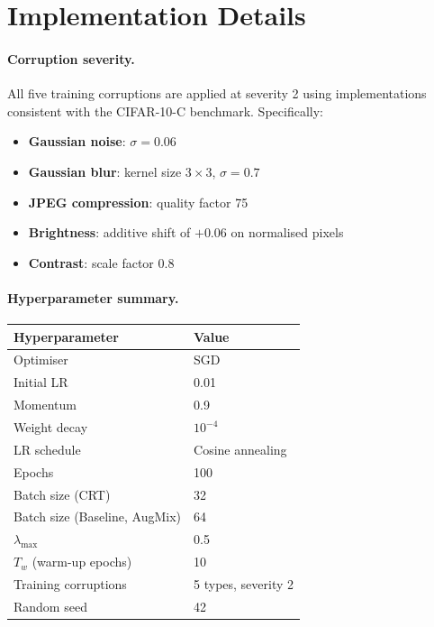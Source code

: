 \documentclass[10pt,twocolumn]{article}
\begin{document}
\appendix

\section{Implementation Details}
\label{app:implementation}

\paragraph{Corruption severity.} All five training corruptions are applied at severity 2 using implementations consistent with the CIFAR-10-C benchmark. Specifically:
\begin{itemize}[leftmargin=*, topsep=2pt, itemsep=1pt]
  \item \textbf{Gaussian noise}: $\sigma = 0.06$
  \item \textbf{Gaussian blur}: kernel size $3 \times 3$, $\sigma = 0.7$
  \item \textbf{JPEG compression}: quality factor 75
  \item \textbf{Brightness}: additive shift of $+0.06$ on normalised pixels
  \item \textbf{Contrast}: scale factor $0.8$
\end{itemize}

\clearpage
\paragraph{Hyperparameter summary.}
\begin{center}
\begin{tabular}{ll}
\toprule
Hyperparameter & Value \\
\midrule
Optimiser & SGD \\
Initial LR & 0.01 \\
Momentum & 0.9 \\
Weight decay & $10^{-4}$ \\
LR schedule & Cosine annealing \\
Epochs & 100 \\
Batch size (CRT) & 32 \\
Batch size (Baseline, AugMix) & 64 \\
$\lambda_{\max}$ & 0.5 \\
$T_w$ (warm-up epochs) & 10 \\
Training corruptions & 5 types, severity 2 \\
Random seed & 42 \\
\bottomrule
\end{tabular}
\end{center} 
\end{document}
